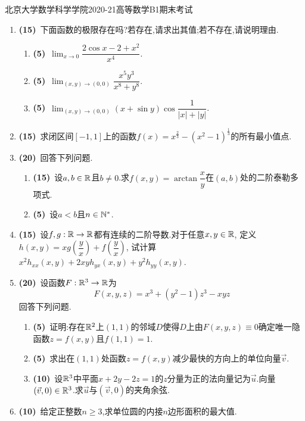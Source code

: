 \documentclass{ctexart}
\begin{document}
\pagestyle{empty}

\begin{center}\Large
    北京大学数学科学学院2020-21高等数学B1期末考试
\end{center}
\begin{enumerate}[leftmargin=*,label=\textbf{\arabic*.}]
    \item \textbf{(15)}\ 下面函数的极限存在吗?若存在,请求出其值;若不存在,请说明理由.
        \begin{enumerate}[label=\textbf{(\arabic*)},leftmargin=*]
            \item \textbf{(5)}\ $\displaystyle\lim_{x\to0}\dfrac{2\cos x-2+x^2}{x^4}$.
            \item \textbf{(5)}\ $\displaystyle\lim_{(x,y)\to(0,0)}\dfrac{x^5y^3}{x^8+y^8}$.
            \item \textbf{(5)}\ $\displaystyle\lim_{(x,y)\to(0,0)}(x+\sin y)\cos\dfrac{1}{|x|+|y|}$.
        \end{enumerate}
    \item \textbf{(15)}\ 求闭区间$[-1,1]$上的函数$f(x)=x^{\frac23}-\left(x^2-1\right)^\frac13$的所有最小值点.
    \item \textbf{(20)}\ 回答下列问题.
        \begin{enumerate}[label=\textbf{(\arabic*)},leftmargin=*]
            \item \textbf{(15)}\ 设$a,b\in\mathbb{R}$且$b\neq0$.求$f(x,y)=\arctan\dfrac xy$在$(a,b)$处的二阶泰勒多项式.
            \item \textbf{(5)}\ 设$a<b$且$n\in\mathbb{N}^*$.
        \end{enumerate}
    \item \textbf{(15)}\ 设$f,g:\mathbb{R}\to\mathbb{R}$都有连续的二阶导数.对于任意$x,y\in\mathbb{R}$,
        定义$h(x,y)=xg\left(\dfrac{y}{x}\right)+f\left(\dfrac{y}{x}\right)$,
        试计算$x^2h_{xx}(x,y)+2xyh_{yx}(x,y)+y^2h_{yy}(x,y)$.
    \item \textbf{(20)}\ 设函数$F:\mathbb{R}^3\to\mathbb{R}$为\[F(x,y,z)=x^3+(y^2-1)z^3-xyz\]回答下列问题.
        \begin{enumerate}[label=\textbf{(\arabic*)},leftmargin=*]
            \item \textbf{(5)}\ 证明:存在$\mathbb{R}^2$上$(1,1)$的邻域$D$使得$D$上由$F(x,y,z)\equiv0$确定唯一隐函数$z=f(x,y)$且$f(1,1)=1$.
            \item \textbf{(5)}\ 求出在$(1,1)$处函数$z=f(x,y)$减少最快的方向上的单位向量$\vec{v}$.
            \item \textbf{(10)}\ 设$\mathbb{R}^3$中平面$x+2y-2z=1$的$z$分量为正的法向量记为$\vec{u}$.向量$(\vec{v},0)\in\mathbb{R}^3$.求$\vec{u}$与$(\vec{v},0)$的夹角余弦.
        \end{enumerate}
    \item \textbf{(10)}\ 给定正整数$n\geqslant 3$,求单位圆的内接$n$边形面积的最大值.
\end{enumerate}
\end{document}

